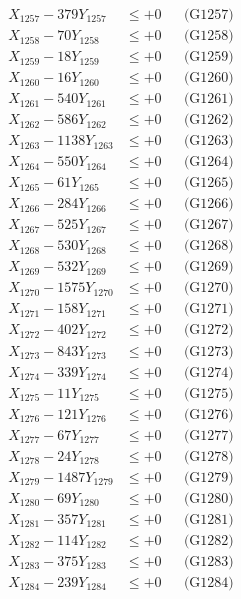 \documentclass[a4paper,10pt]{article}
\begin{document}
{\begin{align}
X_{1257} - 379Y_{1257} &\leq +0 && \text{(G1257)} \\
X_{1258} - 70Y_{1258} &\leq +0 && \text{(G1258)} \\
X_{1259} - 18Y_{1259} &\leq +0 && \text{(G1259)} \\
X_{1260} - 16Y_{1260} &\leq +0 && \text{(G1260)} \\
\allowbreak
X_{1261} - 540Y_{1261} &\leq +0 && \text{(G1261)} \\
X_{1262} - 586Y_{1262} &\leq +0 && \text{(G1262)} \\
X_{1263} - 1138Y_{1263} &\leq +0 && \text{(G1263)} \\
X_{1264} - 550Y_{1264} &\leq +0 && \text{(G1264)} \\
X_{1265} - 61Y_{1265} &\leq +0 && \text{(G1265)} \\
X_{1266} - 284Y_{1266} &\leq +0 && \text{(G1266)} \\
X_{1267} - 525Y_{1267} &\leq +0 && \text{(G1267)} \\
X_{1268} - 530Y_{1268} &\leq +0 && \text{(G1268)} \\
X_{1269} - 532Y_{1269} &\leq +0 && \text{(G1269)} \\
X_{1270} - 1575Y_{1270} &\leq +0 && \text{(G1270)} \\
\allowbreak
X_{1271} - 158Y_{1271} &\leq +0 && \text{(G1271)} \\
X_{1272} - 402Y_{1272} &\leq +0 && \text{(G1272)} \\
X_{1273} - 843Y_{1273} &\leq +0 && \text{(G1273)} \\
X_{1274} - 339Y_{1274} &\leq +0 && \text{(G1274)} \\
X_{1275} - 11Y_{1275} &\leq +0 && \text{(G1275)} \\
X_{1276} - 121Y_{1276} &\leq +0 && \text{(G1276)} \\
X_{1277} - 67Y_{1277} &\leq +0 && \text{(G1277)} \\
X_{1278} - 24Y_{1278} &\leq +0 && \text{(G1278)} \\
X_{1279} - 1487Y_{1279} &\leq +0 && \text{(G1279)} \\
X_{1280} - 69Y_{1280} &\leq +0 && \text{(G1280)} \\
\allowbreak
X_{1281} - 357Y_{1281} &\leq +0 && \text{(G1281)} \\
X_{1282} - 114Y_{1282} &\leq +0 && \text{(G1282)} \\
X_{1283} - 375Y_{1283} &\leq +0 && \text{(G1283)} \\
X_{1284} - 239Y_{1284} &\leq +0 && \text{(G1284)} \\

\end{align}}
\end{document}
